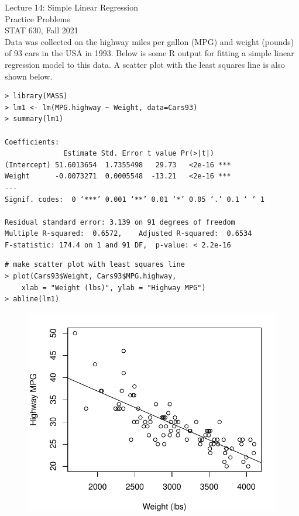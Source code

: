 \documentclass[12pt, fleqn]{article}\usepackage[]{graphicx}\usepackage[]{color}
\begin{document}
\setlength\parindent{0pt}

Lecture 14: Simple Linear Regression\\ 
Practice Problems\\ 
STAT 630, Fall 2021\\

Data was collected on the highway miles per gallon (MPG) and weight (pounds) of 93 cars in the USA in 1993.  Below is some R output for fitting a simple linear regression model to this data.  A scatter plot with the least squares line is also shown below.
\begin{verbatim}
> library(MASS)
> lm1 <- lm(MPG.highway ~ Weight, data=Cars93)
> summary(lm1)

Coefficients:
              Estimate Std. Error t value Pr(>|t|)    
(Intercept) 51.6013654  1.7355498   29.73   <2e-16 ***
Weight      -0.0073271  0.0005548  -13.21   <2e-16 ***
---
Signif. codes:  0 ‘***’ 0.001 ‘**’ 0.01 ‘*’ 0.05 ‘.’ 0.1 ‘ ’ 1

Residual standard error: 3.139 on 91 degrees of freedom
Multiple R-squared:  0.6572,	Adjusted R-squared:  0.6534 
F-statistic: 174.4 on 1 and 91 DF,  p-value: < 2.2e-16
\end{verbatim}

\begin{verbatim}
# make scatter plot with least squares line
> plot(Cars93$Weight, Cars93$MPG.highway, 
    xlab = "Weight (lbs)", ylab = "Highway MPG")
> abline(lm1)
\end{verbatim}

\begin{figure}[ht!]
\includegraphics[scale=0.65]{figure/mpg_scatter_fit.pdf}
\end{figure} 
\clearpage
\end{document}
